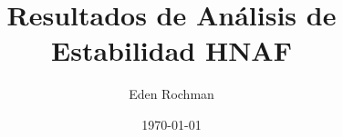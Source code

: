 \documentclass[11pt]{article}
\title{Resultados de Análisis de Estabilidad HNAF}
\author{Eden Rochman}
\date{\today}
\begin{document}
\maketitle
\graphicspath{{./}{./trayectorias/}}

\end{document}
